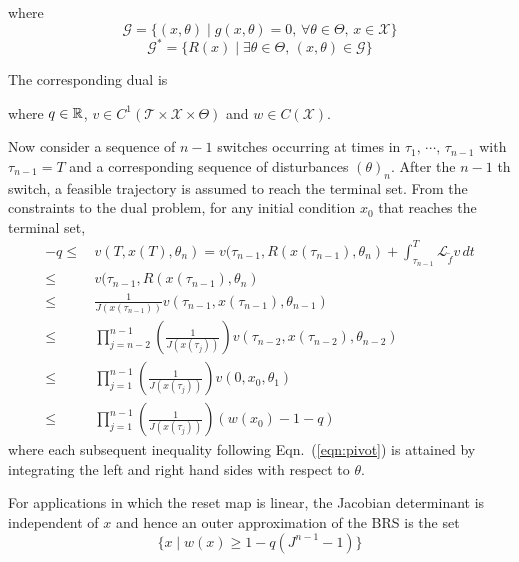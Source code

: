 \documentclass[10pt]{scrartcl}
\theoremstyle{remark}
\providecommand{\R}{\ensuremath \mathbb{R}}
\providecommand{\ip}[1]{\ensuremath \langle #1\rangle}
\begin{document}
where $$\mathcal G=\{(x,\theta)\mid g(x,\theta)=0,\,\forall \theta\in \Theta,\,x\in \mathcal X\}$$
$$\mathcal G^*=\{R(x)\mid \exists \theta\in \Theta,\,(x,\theta)\in \mathcal G\}$$
\par
The corresponding dual is
where $q\in \R$, $v\in C^1(\mathcal T\times \mathcal X\times \Theta)$ and $w\in C(\mathcal X)$.\par
Now consider a sequence of $n-1$ switches occurring at times in $\tau_1,\,\cdots,\,\tau_{n-1}$ with $\tau_{n-1}=T$ and a corresponding sequence of disturbances $(\theta)_n$. After the $n-1$ th switch, a feasible trajectory is assumed to reach the terminal set. From the constraints to the dual problem, for any initial condition $x_0$ that reaches the terminal set,
\begin{align}
-q\le&\, v(T,x(T),\theta_n)=v(\tau_{n-1},R(x(\tau_{n-1}),\theta_n)+\int_{\tau_{n-1}}^T \mathcal L_{\tilde f} v \,dt\\
\le&\, v(\tau_{n-1},R(x(\tau_{n-1}),\theta_n)\label{eqn:pivot}\\
\le&\, \frac{1}{J(x(\tau_{n-1}))}{v(\tau_{n-1},x(\tau_{n-1}),\theta_{n-1})}\\
\le&\,\prod_{j=n-2}^{n-1} \left(\frac{1}{J(x(\tau_{j}))}\right){v(\tau_{n-2},x(\tau_{n-2}),\theta_{n-2})}\\
\le &\,\prod_{j=1}^{n-1} \left(\frac{1}{J(x(\tau_{j}))}\right){v(0,x_0,\theta_1)}\\
\le &\, \prod_{j=1}^{n-1} \left(\frac{1}{J(x(\tau_{j}))}\right) (w(x_0)-1-q)
\end{align}
where each subsequent inequality following Eqn.~(\ref{eqn:pivot}) is attained by integrating the left and right hand sides with respect to $\theta$.\par
For applications in which the reset map is linear, the Jacobian determinant is independent of $x$ and hence an outer approximation of the BRS is the set
$$\{x\mid w(x)\ge 1-q(J^{n-1}-1)\}$$
\end{document}
